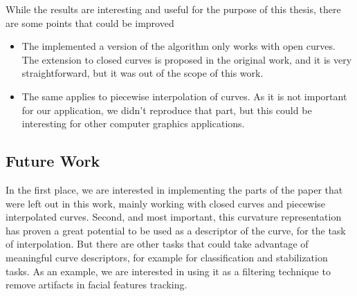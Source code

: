 \documentclass{ipol}
\begin{document}
While the results are interesting and useful for the purpose of this thesis, there are some points that could be improved
\begin{itemize}
	\item The implemented a version of the algorithm only works with open curves. The extension to closed curves is proposed in the original work, and it is very straightforward, but it was out of the scope of this work. 
	\item The same applies to piecewise interpolation of curves. As it is not important for our application, we didn't reproduce that part, but this could be interesting for other computer graphics applications.
\end{itemize}

\subsection{Future Work}

In the first place, we are interested in implementing the parts of the paper that were left out in this work, mainly working with closed curves and piecewise interpolated curves.
Second, and most important, this curvature representation has proven a great potential to be used as a descriptor of the curve, for the task of interpolation. But there are other tasks that could take advantage of meaningful curve descriptors, for example for classification and stabilization tasks. As an example, we are interested in using it as a filtering technique to remove artifacts in facial features tracking.





\end{document}
